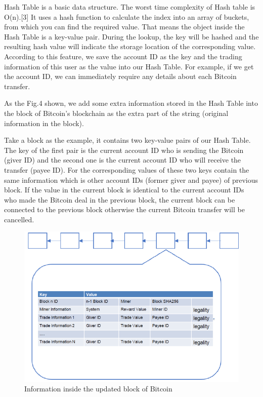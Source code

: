 \documentclass[conference]{IEEEtran}
\begin{document}
Hash Table is a basic data structure. The worst time complexity of Hash table is O(n).[3] It uses a hash function to calculate the index into an array of buckets, from which you can find the required value. That means the object inside the Hash Table is a key-value pair. During the lookup, the key will be hashed and the resulting hash value will indicate the storage location of the corresponding value. According to this feature, we save the account ID as the key and the trading information of this user as the value into our Hash Table. For example, if we get the account ID, we can immediately require any details about each Bitcoin transfer.

As the Fig.4 shown, we add some extra information stored in the Hash Table into the block of Bitcoin’s blockchain as the extra part of the string (original information in the block).

Take a block as the example, it contains two key-value pairs of our Hash Table. The key of the first pair is the current account ID who is sending the Bitcoin (giver ID) and the second one is the current account ID who will receive the transfer (payee ID). For the corresponding values of these two keys contain the same information which is other account IDs (former giver and payee) of previous block. If the value in the current block is identical to the current account IDs who made the Bitcoin deal in the previous block, the current block can be connected to the previous block otherwise the current Bitcoin transfer will be cancelled.

\begin{figure}[ht]
	\centering
	\includegraphics[scale=0.3]{fig4.png}
	\caption{Information inside the updated block of Bitcoin}
	\label{fig:label}
\end{figure}
\end{document}
